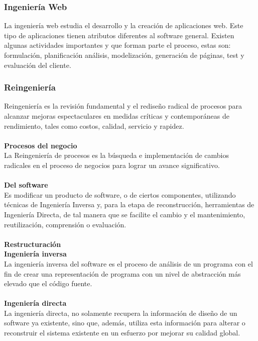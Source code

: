 \documentclass[12pt,twoside]{article}
\begin{document}
\subsubsection{Ingeniería Web}
La ingeniería web estudia el desarrollo y la creación de aplicaciones web. Este tipo de 
aplicaciones tienen atributos diferentes al software general. Existen algunas actividades 
importantes y que forman parte el proceso, estas son: formulación, planificación análisis, 
modelización, generación de páginas, test y evaluación del cliente.
\subsubsection{Reingeniería}
Reingeniería es la revisión fundamental y el rediseño radical de procesos para alcanzar 
mejoras espectaculares en medidas críticas y contemporáneas de rendimiento, tales como 
costos, calidad, servicio y rapidez. \\ \\
\textbf{Procesos del negocio}\\
La Reingeniería de procesos es la búsqueda e implementación de cambios radicales en el 
proceso de negocios para lograr un avance significativo.\\ \\
\textbf{Del software}\\
Es modificar un producto de software, o de ciertos componentes, utilizando técnicas 
de Ingeniería Inversa y, para la etapa de reconstrucción, herramientas de Ingeniería 
Directa, de tal manera que se facilite el cambio y el mantenimiento, reutilización, 
comprensión o evaluación.\\ \\
\textbf{Restructuración}\\
\textbf{Ingeniería inversa}\\
La ingeniería inversa del software es el proceso de análisis de un programa con el 
fin de crear una representación de programa con un nivel de abstracción más elevado 
que el código fuente.\\ \\
\textbf{Ingeniería directa}\\
La ingeniería directa, no solamente recupera la información de diseño de un software 
ya existente, sino que, además, utiliza esta información para alterar o reconstruir el 
sistema existente en un esfuerzo por mejorar su calidad global. \\ \\
\end{document}
